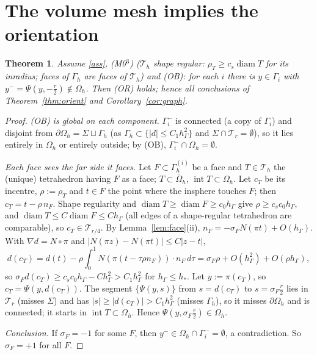 \documentclass[11pt]{article}
\newtheorem{theorem}{Theorem}
\theoremstyle{definition}
\newcommand{\hG}{h_\Gamma}
\newcommand{\Gh}{\Gamma_h}
\newcommand{\Oh}{\Omega_h}
\newcommand{\Th}{\mathcal T_h}
\DeclareMathOperator{\diam}{diam}
\begin{document}
\section{The volume mesh implies the orientation}
\begin{theorem}\label{thm:mesh}
Assume \ref{ass}, (M0$^3$) ($\Th$ shape regular: $\rho_T\ge c_s\diam T$ for its inradius; faces of $\Gh$ are faces of $\Th$) and
\emph{(OB)}: for each $i$ there is $y\in\Gamma_i$ with $y^-=\Psi(y,-\frac r2)\notin\Oh$.
Then (OR) holds; hence all conclusions of Theorem~\ref{thm:orient} and Corollary~\ref{cor:graph}.
\end{theorem}
\begin{proof}
\emph{(OB) is global on each component.} $\Gamma_i^-$ is connected (a copy of $\Gamma_i$) and disjoint from $\partial\Oh=\Sigma\sqcup\Gh$ (as $\Gh\subset\{|d|\le C_1\hG^2\}$ and $\Sigma\cap\mathcal T_r=\emptyset$), so it lies entirely in $\Oh$ or entirely outside; by (OB), $\Gamma_i^-\cap\Oh=\emptyset$.

\emph{Each face sees the far side it faces.} Let $F\subset\Gamma_h^{(i)}$ be a face and $T\in\Th$ the (unique) tetrahedron having $F$ as a face; $T\subset\overline\Oh$, $\operatorname{int}T\subset\Oh$. Let $c_T$ be its incentre, $\rho:=\rho_T$ and $t\in F$ the point where the insphere touches $F$; then $c_T=t-\rho\,n_F$. Shape regularity and $\diam T\ge\diam F\ge c_0\hG$ give $\rho\ge c_sc_0\hG$, and $\diam T\le C\diam F\le C\hG$ (all edges of a shape-regular tetrahedron are comparable), so $c_T\in\mathcal T_{r/4}$. By Lemma~\ref{lem:face}(ii), $n_F=-\sigma_FN(\pi t)+O(\hG)$. With $\nabla d=N\circ\pi$ and $|N(\pi z)-N(\pi t)|\le C|z-t|$,
\[
d(c_T)=d(t)-\rho\int_0^1N(\pi(t-\tau\rho n_F))\cdot n_F\,d\tau=\sigma_F\rho+O(\hG^2)+O(\rho\hG),
\]
so $\sigma_Fd(c_T)\ge c_sc_0\hG-C\hG^2>C_1\hG^2$ for $\hG\le h_\ast$. Let $y:=\pi(c_T)$, so $c_T=\Psi(y,d(c_T))$. The segment $\{\Psi(y,s)\}$ from $s=d(c_T)$ to $s=\sigma_F\frac r2$ lies in $\mathcal T_r$ (misses $\Sigma$) and has $|s|\ge|d(c_T)|>C_1\hG^2$ (misses $\Gh$), so it misses $\partial\Oh$ and is connected; it starts in $\operatorname{int}T\subset\Oh$. Hence $\Psi(y,\sigma_F\frac r2)\in\Oh$.

\emph{Conclusion.} If $\sigma_F=-1$ for some $F$, then $y^-\in\Oh\cap\Gamma_i^-=\emptyset$, a contradiction. So $\sigma_F=+1$ for all $F$.
\end{proof}
\end{document}
